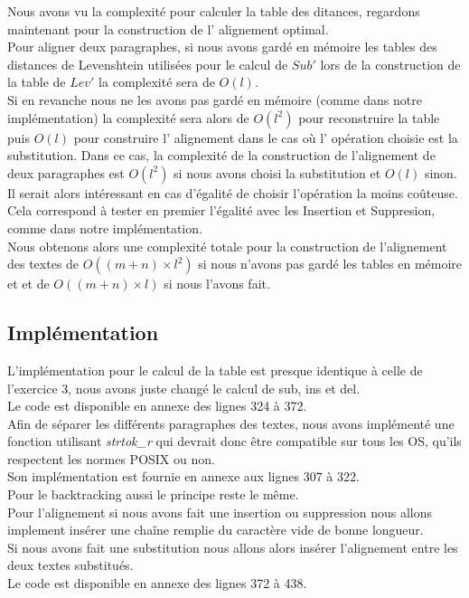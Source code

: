 \documentclass{article}
\begin{document}
Nous avons vu la complexité pour calculer la table des ditances, regardons
maintenant pour la construction de l' alignement optimal.\\
Pour aligner deux paragraphes, si nous avons gardé en mémoire les tables des
distances de Levenshtein utilisées pour le calcul de $Sub'$ lors de la
construction de la table de $Lev'$ la complexité sera de $O(l)$.\\
Si en revanche nous ne les avons pas gardé en mémoire (comme dans notre
implémentation) la complexité sera alors de $O(l^2)$ pour reconstruire la table
puis $O(l)$ pour construire l' alignement dans le cas où l' opération choisie
est la substitution. Dans ce cas, la complexité de la construction de
l'alignement de deux paragraphes est $O(l^2)$ si nous avons choisi la
substitution et $O(l)$ sinon. Il serait alors intéressant en cas d'égalité de
choisir l'opération la moins coûteuse. Cela correspond à tester en premier
l'égalité avec les Insertion et Suppresion, comme dans notre implémentation.\\

Nous obtenons alors une complexité totale pour la construction de l'alignement 
des textes de $O((m+n)\times l^2)$ si nous n'avons pas gardé les tables en
mémoire et et de $O((m+n)\times l)$ si nous l'avons fait.


\subsection{Implémentation}

L'implémentation pour le calcul de la table est presque identique à celle de
l'exercice 3, nous avons juste changé le calcul de sub, ins et del.\\
Le code est disponible en annexe des lignes 324 à 372.\\
Afin de séparer les différents paragraphes des textes, nous avons implémenté
une fonction utilisant \textit{strtok\_r} qui devrait donc être compatible sur tous les
OS, qu'ils respectent les normes POSIX ou non.\\
Son implémentation est fournie en annexe aux lignes 307 à 322.\\

Pour le backtracking aussi le principe reste le même.\\
Pour l'alignement si nous avons fait une insertion ou suppression nous allons
implement insérer une chaîne remplie du caractère vide de bonne longueur.\\
Si nous avons fait une substitution nous allons alors insérer l'alignement
entre les deux textes substitués.\\
Le code est disponible en annexe des lignes 372 à 438.\\
\end{document}
